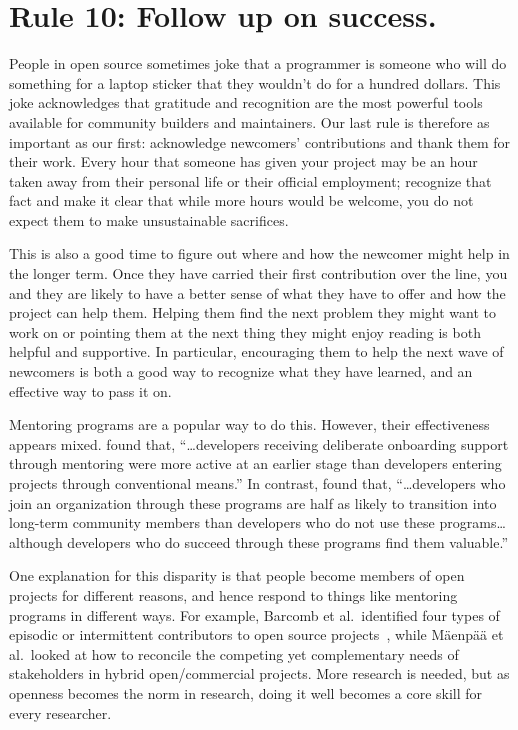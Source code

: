 \documentclass[10pt,letterpaper]{article}
\newcommand{\rulemajor}[1]{\section*{#1}}
\begin{document}
\rulemajor{Rule 10: Follow up on success.}

People in open source sometimes joke that
a programmer is someone who will do something for a laptop sticker
that they wouldn't do for a hundred dollars.
This joke acknowledges that gratitude and recognition are the most powerful tools available for community builders and maintainers.
Our last rule is therefore as important as our first:
acknowledge newcomers' contributions and thank them for their work.
Every hour that someone has given your project may be an hour taken away from their personal life
or their official employment;
recognize that fact
and make it clear that while more hours would be welcome,
you do not expect them to make unsustainable sacrifices.

This is also a good time to figure out where and how the newcomer might help in the longer term.
Once they have carried their first contribution over the line,
you and they are likely to have a better sense of what they have to offer
and how the project can help them.
Helping them find the next problem they might want to work on
or pointing them at the next thing they might enjoy reading
is both helpful and supportive.
In particular,
encouraging them to help the next wave of newcomers
is both a good way to recognize what they have learned,
and an effective way to pass it on.

Mentoring programs are a popular way to do this.
However,
their effectiveness appears mixed.
\cite{fagerholm2014} found that,
``{\ldots}developers receiving deliberate onboarding support through mentoring
were more active at an earlier stage than developers entering projects through conventional means.''
In contrast,
\cite{labuschagne2015} found that,
``{\ldots}developers who join an organization through these programs
are half as likely to transition into long-term community members
than developers who do not use these programs{\ldots}
although developers who do succeed through these programs find them valuable.''

One explanation for this disparity is that people become members of open projects for different reasons,
and hence respond to things like mentoring programs in different ways.
For example,
Barcomb et al.\ identified four types of episodic or intermittent contributors to open source projects~\cite{barcomb2019},
while M\"{a}enp\"{a}\"{a} et al.\ looked at how to reconcile
the competing yet complementary needs of stakeholders in hybrid open/commercial projects.
More research is needed,
but as openness becomes the norm in research,
doing it well becomes a core skill for every researcher.


\end{document}
